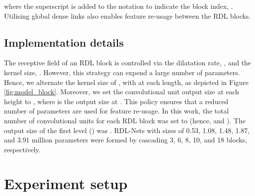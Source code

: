 \documentclass[letterpaper]{article} \usepackage{aaai20}  \usepackage{times}  \usepackage{helvet} \usepackage{courier}  \usepackage[hyphens]{url}  \usepackage{graphicx} \urlstyle{rm} \def\UrlFont{\rm}  \usepackage{graphicx}  \frenchspacing  \setlength{\pdfpagewidth}{8.5in}  \setlength{\pdfpageheight}{11in}
\begin{document}
where the superscript is added to the notation to indicate the block index, . Utilising global dense links also enables feature re-usage between the RDL blocks. 

\subsection{Implementation details}
The receptive field of an RDL block is controlled via the dilatation rate, , and the kernel size, . However, this strategy can expend a large number of parameters. Hence, we alternate the kernel size of , with  at each length, as depicted in Figure \ref{fig:model_block}. Moreover, we set the convolutional unit output size at each height to , where  is the output size at . This policy ensures that a reduced number of parameters are used for feature re-usage. In this work, the total number of convolutional units for each RDL block was set to  (hence,  and ). The output size of the first level () was . RDL-Nets with sizes of 0.53, 1.08, 1.48, 1.87, and 3.91 million parameters were formed by cascading 3, 6, 8, 10, and 18 blocks, respectively.

\section{Experiment setup} \label{secb}
\end{document}
